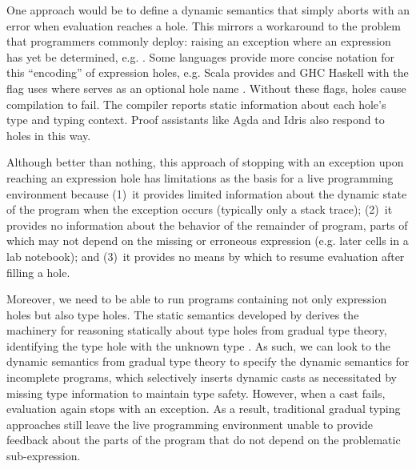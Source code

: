 One approach would be to define a dynamic semantics that simply aborts with an error when evaluation reaches a hole. 
%
This mirrors a workaround to the problem that programmers commonly deploy: 
raising an exception where an expression has yet be determined, e.g. . 
Some languages provide more concise notation for this ``encoding'' of expression holes, 
e.g. Scala provides   
and GHC Haskell with the  flag 
uses 
where  serves as an
optional hole name \cite{GHCHoles}. %
Without these flags, holes cause compilation to fail. The compiler reports static information about each hole's type and typing context. 
Proof assistants like Agda \cite{norell:thesis,norell2009dependently} and Idris \cite{brady2013idris} also respond to holes in this way.

Although better than nothing, this approach of stopping with an exception upon reaching an expression hole has limitations 
as the basis for a live programming environment because 
(1)~it provides limited information about the dynamic state of the program when the exception occurs
(typically only a stack trace);  
(2)~it provides no information about the behavior of the remainder of program, 
parts of which may not depend on the missing or erroneous expression (e.g. later cells in a lab notebook); and 
(3)~it provides no means by which to resume evaluation after filling a hole.

Moreover, we need to be able to run programs containing not only expression holes but also type holes.
The static semantics developed by \citet{popl-paper} derives the machinery for 
reasoning statically about type holes from gradual type theory, 
identifying the type hole with the unknown type \cite{DBLP:conf/snapl/SiekVCB15,Siek06a}.
%
As such, we can look to the dynamic semantics from
gradual type theory to specify the dynamic semantics for incomplete programs,
which selectively inserts dynamic casts as necessitated by missing type information to maintain type safety. 
However, when a cast fails, evaluation again stops with 
an exception.
%
As a result, traditional gradual typing approaches still leave the live programming environment unable to provide feedback about the parts 
of the program that do not depend on the problematic sub-expression.


